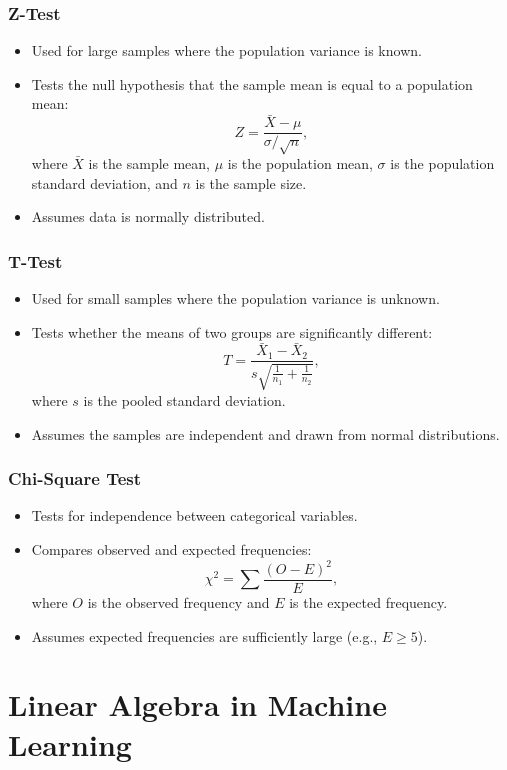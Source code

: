\documentclass[12pt,a4paper]{article}
\begin{document}
\subsubsection{Z-Test}
\begin{itemize}
    \item Used for large samples where the population variance is known.
    \item Tests the null hypothesis that the sample mean is equal to a population mean:
    \[ Z = \frac{\bar{X} - \mu}{\sigma / \sqrt{n}}, \]
    where $\bar{X}$ is the sample mean, $\mu$ is the population mean, $\sigma$ is the population standard deviation, and $n$ is the sample size.
    \item Assumes data is normally distributed.
\end{itemize}

\subsubsection{T-Test}
\begin{itemize}
    \item Used for small samples where the population variance is unknown.
    \item Tests whether the means of two groups are significantly different:
    \[ T = \frac{\bar{X}_1 - \bar{X}_2}{s \sqrt{\frac{1}{n_1} + \frac{1}{n_2}}}, \]
    where $s$ is the pooled standard deviation.
    \item Assumes the samples are independent and drawn from normal distributions.
\end{itemize}

\subsubsection{Chi-Square Test}
\begin{itemize}
    \item Tests for independence between categorical variables.
    \item Compares observed and expected frequencies:
    \[ \chi^2 = \sum \frac{(O - E)^2}{E}, \]
    where $O$ is the observed frequency and $E$ is the expected frequency.
    \item Assumes expected frequencies are sufficiently large (e.g., $E \geq 5$).
\end{itemize}

\pagebreak
\section{Linear Algebra in Machine Learning}
\end{document}
